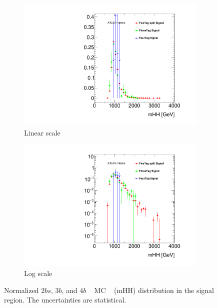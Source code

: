 \begin{figure}[htbp!]
  \centering
  \captionsetup{justification=centering}
  \hspace{-0.5cm}
    \begin{subfigure}[b]{0.45\textwidth}
        \includegraphics[width=\textwidth,angle=-90]{figures/boosted/Other/ttbar_compare_mHH_l.pdf}
        \caption{Linear scale}
        \label{fig:ttshapeComp_lin}
    \end{subfigure}
    \quad
    \begin{subfigure}[b]{0.45\textwidth}
        \includegraphics[width=\textwidth,angle=-90]{figures/boosted/Other/ttbar_compare_mHH_l_1.pdf}
        \caption{Log scale}
        \label{fig:ttshapeComp_log}
    \end{subfigure}
   \caption{Normalized $2bs$, $3b$, and $4b$ \ttbar~ MC \mtwoJ~ (mHH) distribution in the signal region. The uncertainties are statistical.}
  \label{fig:ttshapeComp}
\end{figure}


